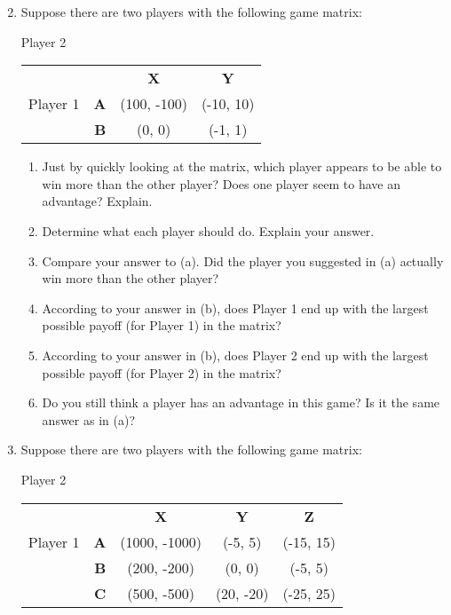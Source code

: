 \begin{enumerate}
\setcounter{enumi}{1}

\item Suppose there are two players with the following game matrix:

\hspace{1.2in}Player 2

\begin{tabular}{l|r|c|c|}\cline{2-4}
&&\textbf{X}&\textbf{Y}\\ \cline{2-4}
Player 1&\textbf{A} &(100, -100)&(-10, 10)\\ \cline{2-4}
&\textbf{B} &(0, 0)&(-1, 1)\\ \cline{2-4}

\end{tabular}
\begin{enumerate}
\item Just by quickly looking at the matrix, which player appears to be able to win more than the other player? Does one player seem to have an advantage? Explain.
\item Determine what each player should do. Explain your answer.
\item Compare your answer to (a). Did the player you suggested in (a) actually win more than the other player?
\item According to your answer in (b), does Player 1 end up with the largest possible payoff (for Player 1) in the matrix?
\item According to your answer in (b), does Player 2 end up with the largest possible payoff (for Player 2) in the matrix?
\item Do you still think a player has an advantage in this game? Is it the same answer as in (a)?
\end{enumerate}
\vspace{.5in}

\item Suppose there are two players with the following game matrix:

\vspace{.1in}

\hspace{1.3in}Player 2

\begin{tabular}{l|r|c|c|c|}\cline{2-5}
&&\textbf{X}&\textbf{Y}&\textbf{Z}\\ \cline{2-5}
Player 1&\textbf{A} &(1000, -1000)&(-5, 5)&(-15, 15)\\ \cline{2-5}
&\textbf{B} &(200, -200)&(0, 0)&(-5, 5)\\ \cline{2-5}
&\textbf{C} &(500, -500)&(20, -20)&(-25, 25)\\ \cline{2-5}


\end{tabular}
\end{enumerate}
